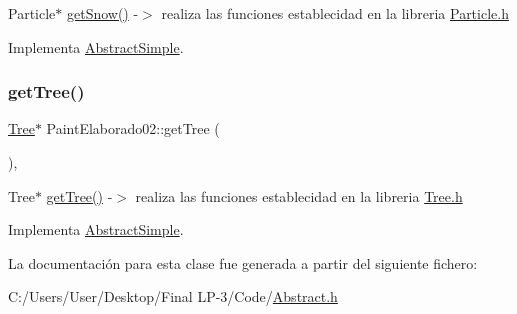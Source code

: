 Particle$\ast$ \mbox{\hyperlink{class_paint_elaborado02_ab2e3d866b6b3a650b7cb1ca7186ec3a3}{get\+Snow()}} -\/$>$ realiza las funciones establecidad en la libreria \mbox{\hyperlink{_particle_8h}{Particle.\+h}} 

Implementa \mbox{\hyperlink{class_abstract_simple_aad971de50be686f491109651a387ce5e}{Abstract\+Simple}}.

\mbox{\label{class_paint_elaborado02_af943b1fe3a9f276a8780e937150a3ff8}} 
\subsubsection{\texorpdfstring{getTree()}{getTree()}}
{\footnotesize\ttfamily \mbox{\hyperlink{class_tree}{Tree}}$\ast$ Paint\+Elaborado02\+::get\+Tree (\begin{DoxyParamCaption}{ }\end{DoxyParamCaption})\hspace{0.3cm}{\ttfamily [inline]}, {\ttfamily [virtual]}}

Tree$\ast$ \mbox{\hyperlink{class_paint_elaborado02_af943b1fe3a9f276a8780e937150a3ff8}{get\+Tree()}} -\/$>$ realiza las funciones establecidad en la libreria \mbox{\hyperlink{_tree_8h}{Tree.\+h}} 

Implementa \mbox{\hyperlink{class_abstract_simple_ad90f5d7d3415a29af8bbf10ad8d89772}{Abstract\+Simple}}.



La documentación para esta clase fue generada a partir del siguiente fichero\+:\begin{DoxyCompactItemize}
\item 
C\+:/\+Users/\+User/\+Desktop/\+Final L\+P-\/3/\+Code/\mbox{\hyperlink{_abstract_8h}{Abstract.\+h}}\end{DoxyCompactItemize}
